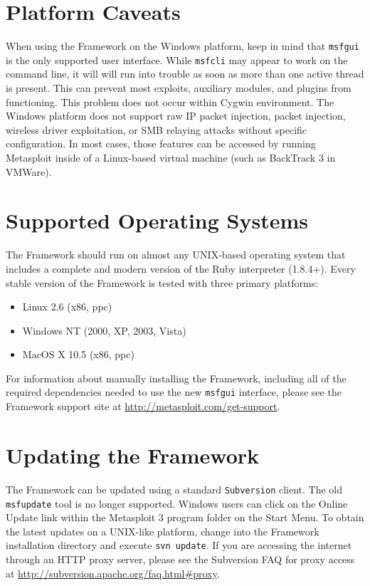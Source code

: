 \documentclass{report}
\begin{document}
    \section{Platform Caveats}
    \label{INSTALL-CAVEAT}

\par
When using the Framework on the Windows platform, keep in mind that
\texttt{msfgui} is the only supported user interface. While \texttt{msfcli} may
appear to work on the command line, it will will run into trouble as soon as
more than one active thread is present. This can prevent most exploits,
auxiliary modules, and plugins from functioning. This problem does not occur
within Cygwin environment. The Windows platform does not support raw IP packet
injection, packet injection, wireless driver exploitation, or SMB relaying
attacks without specific configuration. In most cases, those features can be
accessed by running Metasploit inside of a Linux-based virtual machine (such as
BackTrack 3 in VMWare).

    \section{Supported Operating Systems}
    \label{INSTALL-SUPPORT}

\par
The Framework should run on almost any UNIX-based operating system that includes
a complete and modern version of the Ruby interpreter (1.8.4+). Every stable
version of the Framework is tested with three primary platforms:

\begin{itemize}
\item Linux 2.6 (x86, ppc)
\item Windows NT (2000, XP, 2003, Vista)
\item MacOS X 10.5 (x86, ppc)
\end{itemize}

\par
For information about manually installing the Framework, including all of the
required dependencies needed to use the new \texttt{msfgui} interface, please
see the Framework support site at \url{http://metasploit.com/get-support}.

    \section{Updating the Framework}
    \label{INSTALL-UPDATE}

\par
The Framework can be updated using a standard \texttt{Subversion} client. The
old \texttt{msfupdate} tool is no longer supported. Windows users can click on
the Online Update link within the Metasploit 3 program folder on the Start Menu.
To obtain the latest updates on a UNIX-like platform, change into the Framework
installation directory and execute \texttt{svn update}. If you are accessing the
internet through an HTTP proxy server, please see the Subversion FAQ for proxy
access at \url{http://subversion.apache.org/faq.html#proxy}.
\end{document}
